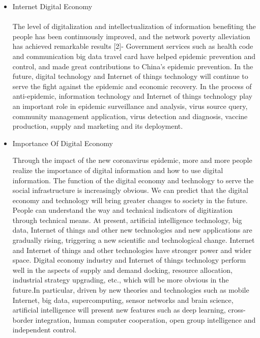 \documentclass[12pt]{report}
\begin{document}
\begin{itemize}
    \item  Internet Digital Economy
   \paragraph{}  The level of digitalization and intellectualization of information benefiting the people has
been continuously improved, and the network poverty alleviation has achieved remarkable results
[2]- Government services such as health code and communication big data travel card have helped
epidemic prevention and control, and made great contributions to China’s epidemic prevention. In
the future, digital technology and Internet of things technology will continue to serve the fight
against the epidemic and economic recovery. In the process of anti-epidemic, information
technology and Internet of things technology play an important role in epidemic surveillance and
analysis, virus source query, community management application, virus detection and diagnosis,
vaccine production, supply and marketing and its deployment.
\item  Importance Of Digital Economy
\par Through the impact of the new coronavirus epidemic, more and more people realize the
importance of digital information and how to use digital information. The function of the digital
economy and technology to serve the social infrastructure is increasingly obvious. We can predict
that the digital economy and technology will bring greater changes to society in the future. People
can understand the way and technical indicators of digitization through technical means. At
present, artificial intelligence technology, big data, Internet of things and other new technologies
and new applications are gradually rising, triggering a new scientific and technological change.
Internet and Internet of things and other technologies have stronger power and wider space.
Digital economy industry and Internet of things technology perform well in the aspects of supply
and demand docking, resource allocation, industrial strategy upgrading, etc., which will be more
obvious in the future.In particular, driven by new theories and technologies such as mobile
Internet, big data, supercomputing, sensor networks and brain science, artificial intelligence will
present new features such as deep learning, cross-border integration, human computer
cooperation, open group intelligence and independent control.
\end{itemize}
\end{document}
